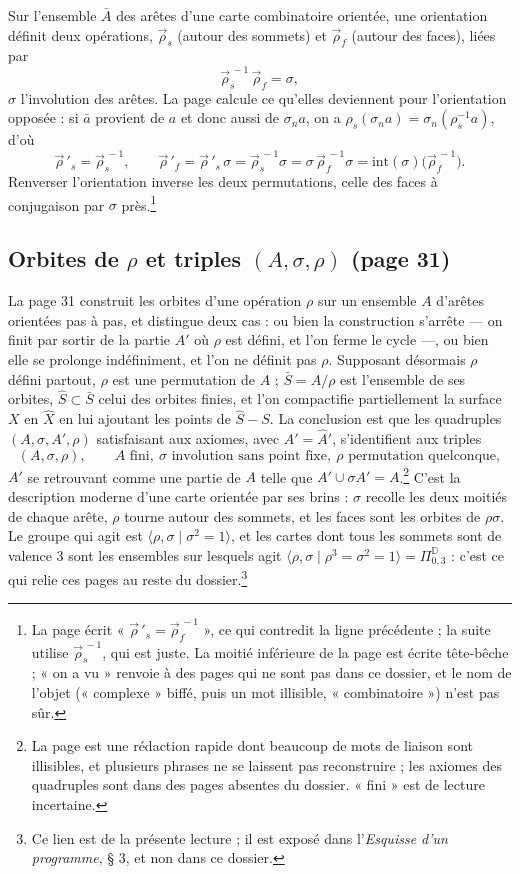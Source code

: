 \documentclass[11pt,a4paper]{article}
\begin{document}
Sur l'ensemble $\bar A$ des arêtes d'une carte combinatoire orientée, une
orientation définit deux opérations, $\vec\rho_s$ (autour des sommets) et
$\vec\rho_f$ (autour des faces), liées par
\[
\vec\rho_s^{\,-1}\,\vec\rho_f = \sigma ,
\]
$\sigma$ l'involution des arêtes. La page calcule ce qu'elles deviennent pour
l'orientation opposée : si $\bar a$ provient de $a$ et donc aussi de
$\sigma_n a$, on a $\rho_s(\sigma_n a) = \sigma_n(\rho_s^{-1}a)$, d'où
\[
\vec\rho\,'_s = \vec\rho_s^{\,-1}, \qquad
\vec\rho\,'_f = \vec\rho\,'_s\,\sigma = \vec\rho_s^{\,-1}\sigma
= \sigma\,\vec\rho_f^{\,-1}\sigma = \mathrm{int}(\sigma)\bigl(\vec\rho_f^{\,-1}\bigr)
.
\]
Renverser l'orientation inverse les deux permutations, celle des faces à
conjugaison par $\sigma$ près.\footnote{La page écrit
« $\vec\rho\,'_s = \vec\rho_f^{\,-1}$ », ce qui contredit la ligne précédente ;
la suite utilise $\vec\rho_s^{\,-1}$, qui est juste. La moitié inférieure de la
page est écrite tête-bêche ; « on a vu » renvoie à des pages qui ne sont pas dans
ce dossier, et le nom de l'objet (« complexe » biffé, puis un mot illisible,
« combinatoire ») n'est pas sûr.}

\subsection*{Orbites de $\rho$ et triples $(A, \sigma, \rho)$ (page 31)}

La page 31 construit les orbites d'une opération $\rho$ sur un ensemble $A$ d'arêtes
orientées pas à pas, et distingue deux cas : ou bien la construction s'arrête —
on finit par sortir de la partie $A'$ où $\rho$ est défini, et l'on ferme le
cycle —, ou bien elle se prolonge indéfiniment, et l'on ne définit pas $\rho$.
Supposant désormais $\rho$ défini partout, $\rho$ est une permutation de $A$ ;
$\bar S = A/\rho$ est l'ensemble de ses orbites, $\hat S \subset \bar S$ celui des
orbites finies, et l'on compactifie partiellement la surface $X$ en $\hat X$ en
lui ajoutant les points de $\hat S - S$. La conclusion est que les quadruples
$(A, \sigma, A', \rho)$ satisfaisant aux axiomes, avec $A' = \hat A'$,
s'identifient aux triples
\[
(A, \sigma, \rho), \qquad A \text{ fini},\ \sigma \text{ involution sans point
fixe},\ \rho \text{ permutation quelconque} ,
\]
$A'$ se retrouvant comme une partie de $A$ telle que $A' \cup \sigma A' =
A$.\footnote{La page est une rédaction rapide dont beaucoup de mots de liaison
sont illisibles, et plusieurs phrases ne se laissent pas reconstruire ; les
axiomes des quadruples sont dans des pages absentes du dossier. « fini » est de
lecture incertaine.} C'est la description moderne d'une carte orientée par ses
brins : $\sigma$ recolle les deux moitiés de chaque arête, $\rho$ tourne autour
des sommets, et les faces sont les orbites de $\rho\sigma$. Le groupe qui agit est
$\langle \rho, \sigma \mid \sigma^2 = 1 \rangle$, et les cartes dont tous les
sommets sont de valence $3$ sont les ensembles sur lesquels agit
$\langle \rho, \sigma \mid \rho^3 = \sigma^2 = 1 \rangle = \Pi^{\mathbb{D}}_{0,3}$ :
c'est ce qui relie ces pages au reste du dossier.\footnote{Ce lien est de la
présente lecture ; il est exposé dans l'\emph{Esquisse d'un programme}, § 3, et
non dans ce dossier.}
\end{document}
